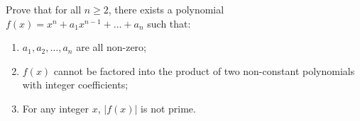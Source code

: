 Prove that for all $n\geq2$, there exists a polynomial $f(x)=x^n+a_1x^{n-1}+\ldots+a_n$ such that:
\begin{enumerate}[label=(\arabic*)]
	\item $a_1,a_2,\ldots,a_n$ are all non-zero;
	\item $f(x)$ cannot be factored into the product of two non-constant polynomials with integer coefficients;
	\item For any integer $x$, $|f(x)|$ is not prime.
\end{enumerate}